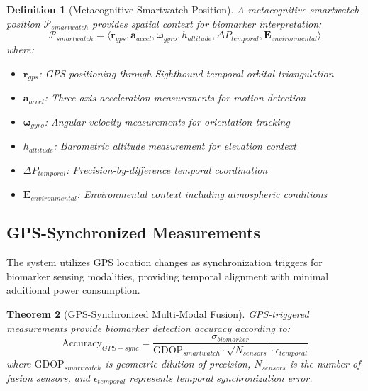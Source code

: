 \documentclass[12pt,a4paper]{article}
\newtheorem{theorem}{Theorem}[section]
\newtheorem{definition}[theorem]{Definition}
\begin{document}
\begin{definition}[Metacognitive Smartwatch Position]
A metacognitive smartwatch position \(\mathcal{P}_{smartwatch}\) provides spatial context for biomarker interpretation:
\begin{equation}
\mathcal{P}_{smartwatch} = \langle \mathbf{r}_{gps}, \mathbf{a}_{accel}, \mathbf{\omega}_{gyro}, h_{altitude}, \Delta P_{temporal}, \mathbf{E}_{environmental} \rangle
\end{equation}
where:
\begin{itemize}
\item \(\mathbf{r}_{gps}\): GPS positioning through Sighthound temporal-orbital triangulation
\item \(\mathbf{a}_{accel}\): Three-axis acceleration measurements for motion detection
\item \(\mathbf{\omega}_{gyro}\): Angular velocity measurements for orientation tracking
\item \(h_{altitude}\): Barometric altitude measurement for elevation context
\item \(\Delta P_{temporal}\): Precision-by-difference temporal coordination
\item \(\mathbf{E}_{environmental}\): Environmental context including atmospheric conditions
\end{itemize}
\end{definition}

\subsection{GPS-Synchronized Measurements}

The system utilizes GPS location changes as synchronization triggers for biomarker sensing modalities, providing temporal alignment with minimal additional power consumption.

\begin{theorem}[GPS-Synchronized Multi-Modal Fusion]
GPS-triggered measurements provide biomarker detection accuracy according to:
\begin{equation}
\text{Accuracy}_{GPS-sync} = \frac{\sigma_{biomarker}}{\text{GDOP}_{smartwatch} \cdot \sqrt{N_{sensors}} \cdot \epsilon_{temporal}}
\end{equation}
where \(\text{GDOP}_{smartwatch}\) is geometric dilution of precision, \(N_{sensors}\) is the number of fusion sensors, and \(\epsilon_{temporal}\) represents temporal synchronization error.
\end{theorem}
\end{document}
